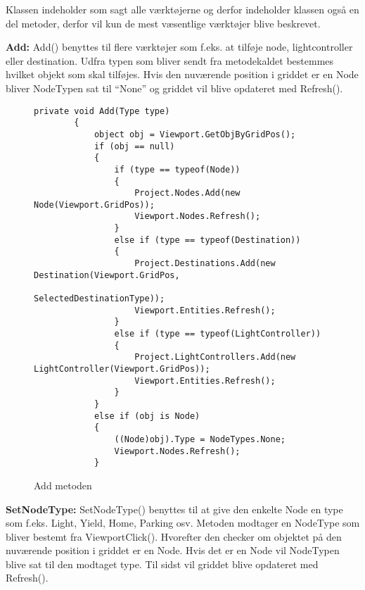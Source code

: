 \vspace{5mm}

Klassen indeholder som sagt alle værktøjerne og derfor indeholder klassen også en del metoder, derfor vil kun de mest væsentlige værktøjer blive beskrevet.

\vspace{5mm}

\textbf{Add:} \newline
Add() benyttes til flere værktøjer som f.eks. at tilføje node, lightcontroller eller destination. Udfra typen som bliver sendt fra metodekaldet bestemmes hvilket objekt som skal tilføjes. Hvis den nuværende position i griddet er en Node bliver NodeTypen sat til “None” og griddet vil blive opdateret med Refresh(). 

\begin{figure}[H]
\begin{lstlisting}
private void Add(Type type)
        {
            object obj = Viewport.GetObjByGridPos();
            if (obj == null)
            {
                if (type == typeof(Node))
                {
                    Project.Nodes.Add(new Node(Viewport.GridPos));
                    Viewport.Nodes.Refresh();
                }
                else if (type == typeof(Destination))
                {
                    Project.Destinations.Add(new Destination(Viewport.GridPos,  
		                            SelectedDestinationType));
                    Viewport.Entities.Refresh();
                }
                else if (type == typeof(LightController))
                {
                    Project.LightControllers.Add(new LightController(Viewport.GridPos));
                    Viewport.Entities.Refresh();
                }
            }
            else if (obj is Node)
            {
                ((Node)obj).Type = NodeTypes.None;
                Viewport.Nodes.Refresh();
            }
\end{lstlisting}
\caption{Add metoden}\label{AddCode}
\end{figure}

\vspace{5mm}

\textbf{SetNodeType:} \newline
SetNodeType() benyttes til at give den enkelte Node en type som f.eks. Light, Yield, Home, Parking osv. Metoden modtager en NodeType som bliver bestemt fra ViewportClick(). Hvorefter den checker om objektet på den nuværende position i griddet er en Node. Hvis det er en Node vil NodeTypen blive sat til den modtaget type. Til sidst vil griddet blive opdateret med Refresh().

